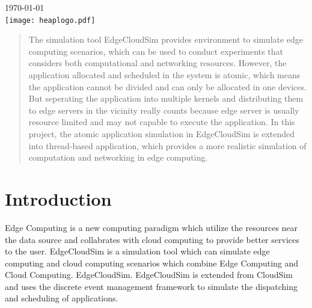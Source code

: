 \begin{titlepage}

{\large \today}\\[2cm] %


\texttt{[image: heaplogo.pdf]}\\[1cm] %
 

\vfill %

\end{titlepage}




\begin{abstract}
The simulation tool EdgeCloudSim provides environment to simulate edge computing scenarios, which can be used to conduct experiments that considers both computational and networking resources. However, the application allocated and scheduled in the system is atomic, which means the application cannot be divided and can only be allocated in one devices. But seperating the application into multiple kernels and distributing them to edge servers in the vicinity really counts because edge server is usually resource limited and may not capable to execute the application. In this project, the atomic application simulation in EdgeCloudSim is extended into thread-based application, which provides a more realistic simulation of computation and networking in edge computing.
\end{abstract}

\section{Introduction}

Edge Computing is a new computing paradigm which utilize the resources near the data source and collabrates with cloud computing to provide better services to the user. EdgeCloudSim is a simulation tool which can simulate edge computing and cloud computing scenarios which combine Edge Computing and Cloud Computing. EdgeCloudSim. EdgeCloudSim is extended from CloudSim and uses the discrete event management framework to simulate the dispatching and scheduling of applications. 


